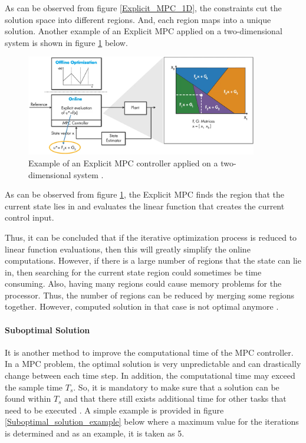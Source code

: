 \documentclass{thesisreport}
\begin{document}
\noindent As can be observed from figure \ref{Explicit_MPC_1D}, the constraints cut the solution space into different regions. And, each region maps into a unique solution.
Another example of an Explicit MPC applied on a two-dimensional system is shown in figure \ref{Explicit_MPC_2D} below. 

\newpage

\begin{figure}[h]
\centering
\includegraphics[width=0.9\textwidth]{Images/Control/Explicit_MPC_b}
\caption{Example of an Explicit MPC controller applied on a two-dimensional system \cite{MathWorks2018_new}.}
\label{Explicit_MPC_2D}
\end{figure}

\noindent As can be observed from figure \ref{Explicit_MPC_2D}, the Explicit MPC finds the  region that the current state lies in and evaluates the linear function that creates the current control input.

\noindent Thus, it can be concluded that if the iterative optimization process is reduced to linear function evaluations, then this will greatly simplify the online computations. However, if there is a large number of regions that the state can lie in, then searching for the current state region could sometimes be time consuming. Also, having many regions could cause memory problems for the processor. Thus, the number of regions can be reduced by merging some regions together. However, computed solution in that case is not optimal anymore \cite{Hovland2008}.

\paragraph{Suboptimal Solution}
It is another method to improve the computational time of the MPC controller. In a MPC problem, the optimal solution is very unpredictable and can drastically change between each time step. In addition, the computational time may exceed the sample time $T_s$. So, it is mandatory to make sure that a solution can be found within $T_s$ and that there still exists additional time for other tasks that need to be executed \cite{Gulez2014}. A simple example is provided in figure \ref{Suboptimal_solution_example} below where a maximum value for the iterations is determined and as an example, it is taken as 5. 
\end{document}
